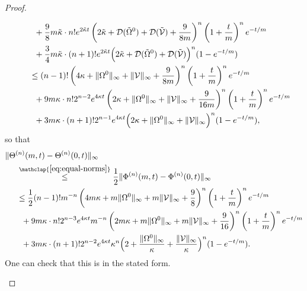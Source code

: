 \documentclass[11pt,reqno]{amsart}
\theoremstyle{definition}
\theoremstyle{remark}
\begin{document}
\begin{proof}
\begin{enumerate}
\begin{align*}
		&  \hspace{0.7cm} + \frac 98m\tilde{\kappa} \cdot  n!e^{2\tilde{\kappa}t}\left(2\tilde{\kappa}+\mathcal{D}(\tilde{\Omega}^0)+\mathcal{D}(\tilde{\mathcal{V}})+\frac{9}{8m}\right)^{n}\left(1+\frac tm\right)^{n}e^{-t/m}\\
		& \hspace{0.7cm} + \frac 34m\tilde{\kappa} \cdot  (n+1)!e^{2\tilde{\kappa} t} \Big(2\tilde{\kappa}+\mathcal{D}(\tilde{\Omega}^0)+\mathcal{D}(\tilde{\mathcal{V}}) \Big)^{n}(1-e^{-t/m})\\
		& \hspace{0.5cm} \le (n-1)!\left(4\kappa+\|\Omega^0\|_\infty+\|\mathcal{V}\|_\infty+\frac{9}{8m}\right)^{n}\left(1+\frac tm\right)^{n}e^{-t/m}\\
		&  \hspace{0.7cm} + 9m\kappa \cdot  n!2^{n-2}e^{4\kappa t}\left(2\kappa+\|\Omega^0\|_\infty+\|\mathcal{V}\|_\infty+\frac{9}{16m}\right)^{n}\left(1+\frac tm\right)^{n}e^{-t/m}\\
		& \hspace{0.7cm} + 3m \kappa \cdot  (n+1)!2^{n-1}e^{4\kappa t} \Big(2\kappa+\|\Omega^0\|_\infty+\|\mathcal{V}\|_\infty \Big)^{n}(1-e^{-t/m}),
	\end{align*}
	so that
		\begin{align*}
		&\|\Theta^{(n)}(m,t)-\Theta^{(n)}(0,t)\|_\infty\\
		&\hspace{0.5cm}\stackrel{\mathclap{\eqref{eq:equal-norms}}}{\le} \frac 12\|\Phi^{(n)}(m,t)-\Phi^{(n)}(0,t)\|_\infty\\
		& \hspace{0.5cm} \le \frac 12(n-1)!m^{-n}\left(4m\kappa+m\|\Omega^0\|_\infty+m\|\mathcal{V}\|_\infty+\frac{9}{8}\right)^{n}\left(1+\frac tm\right)^{n}e^{-t/m}\\
&  \hspace{0.7cm} + 9m\kappa \cdot  n!2^{n-3}e^{4\kappa t}m^{-n}\left(2m\kappa+m\|\Omega^0\|_\infty+m\|\mathcal{V}\|_\infty+\frac{9}{16}\right)^{n}\left(1+\frac tm\right)^{n}e^{-t/m}\\
& \hspace{0.7cm} + 3m \kappa \cdot  (n+1)!2^{n-2}e^{4\kappa t} \kappa^n \Big(2+\frac{\|\Omega^0\|_\infty}{\kappa}+\frac{\|\mathcal{V}\|_\infty}\kappa \Big)^{n}(1-e^{-t/m}).
	\end{align*}
	One can check that this is in the stated form.
\end{enumerate}
\end{proof}
\end{document}
